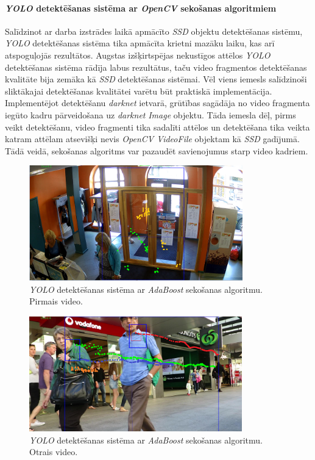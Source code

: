 \paragraph{\textit{YOLO} detektēšanas sistēma ar \textit{OpenCV} sekošanas algoritmiem}
\hfill\par
Salīdzinot ar darba izstrādes laikā apmācīto \textit{SSD} objektu detektēšanas sistēmu, \textit{YOLO} detektēšanas sistēma tika apmācīta krietni mazāku laiku, kas arī atspoguļojās rezultātos. Augstas izšķirtspējas nekustīgos attēlos \textit{YOLO} detektēšanas sistēma rādīja labus rezultātus, taču video fragmentos detektēšanas kvalitāte bija zemāka kā \textit{SSD} detektēšanas sistēmai. Vēl viens iemesls salīdzinoši sliktākajai detektēšanas kvalitātei varētu būt praktiskā implementācija. Implementējot detektēšanu \textit{darknet} ietvarā, grūtības sagādāja no video fragmenta iegūto kadru pārveidošana uz \textit{darknet} \textit{Image} objektu. Tāda iemesla dēļ, pirms veikt detektēšanu, video fragmenti tika sadalīti attēlos un detektēšana tika veikta katram attēlam atsevišķi nevis \textit{OpenCV VideoFile} objektam kā \textit{SSD} gadījumā. Tādā veidā, sekošanas algoritms var pazaudēt savienojumus starp video kadriem.
\newpage
\begin{figure}[H]%
	\centering
	\includegraphics[height=5cm]{images/yolo1.png} %
	\caption{\textit{YOLO} detektēšanas sistēma ar \textit{AdaBoost} sekošanas algoritmu. Pirmais video.}%
	\label{fig:example}%
\end{figure}
\begin{figure}[H]%
	\centering
	\includegraphics[height=5cm]{images/yolo2.png} %
	\caption{\textit{YOLO} detektēšanas sistēma ar \textit{AdaBoost} sekošanas algoritmu. Otrais video.}%
	\label{fig:example}%
\end{figure}
